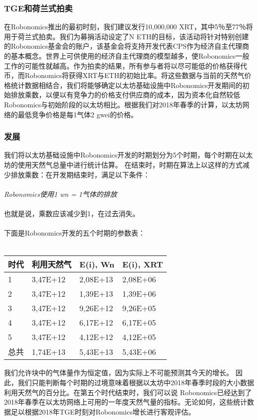 \documentclass[UTF8]{article}
\begin{document}
\subsubsection{TGE和荷兰式拍卖}

在Robonomics推出的最初时刻，我们建议发行10,000,000 XRT，其中5％至77％将用于荷兰式拍卖。我们为募捐活动设定了N ETH的目标，该活动将针对特别创建的Robonomics基金会的账户，该基金会将支持开发代表CPS作为经济自主代理商的基本概念。世界上可供使用的经济自主代理商的模型越多，使Robonomics一般工作的可能性就越高。作为拍卖的结果，所有参与者将以尽可能低的价格获得代币，而Robonomics将获得XRT与ETH的初始比率。将这些数据与当前的天然气价格统计数据相结合，我们将能够确定以太坊基础设施中Robonomics开发期间的初始排放乘数，以便以有竞争力的价格支付供应商的成本，因为资本化自然较低Robonomics与初始阶段的以太坊相比。根据我们对2018年春季的计算，以太坊网络的最低​​竞争价格是每1气体2 gwei的价格。

\subsubsection{发展}

我们将以太坊基础设施中Robonomics开发的时期划分为5个时期，每个时期在以太坊的使用天然气总量中进行统计估算。 在结束时，时期在算法上以这样的方式减少排放乘数：在开发期结束时，满足以下条件：
\\
\\
\textit{Robonomics使用1 wn = 1气体的排放}
\\
\\
也就是说，乘数应该减少到1，在过去消失。
\\
\\
下面是Robonomics开发的五个时期的参数表：
\\
\\
\begin{tabular}{ |l |l |l |l}
 \textbf{时代} & \textbf{利用天然气} & \textbf{E(i), Wn} & \textbf{E(i), XRT} \\ 
 \hline
 1 &  3,47E+12 & 2,08E+13 & 2,08E+06 \\ 
 2 &  3,47E+12 & 1,39E+13 & 1,39E+06 \\ 
 3 &  3,47E+12 & 9,26E+12 & 9,26E+05 \\ 
 4 &  3,47E+12 & 6,17E+12 & 6,17E+05 \\ 
 5 &  3,47E+12 & 4,12E+12 & 4,12E+05 \\ 
 总共 &  1,74E+13 & 5,43E+13 & 5,43E+06 \\ 
\end{tabular}

我们允许块中的气体量作为恒定值，因为实际上不可能预测其今天的增长。 因此，我们只能判断每个时期的过境意味着根据以太坊中2018年春季时段的大小数据利用天然气的百分比。在第五个时代结束时，我们可以说 Robonomics已经达到了2018年春季在以太坊网络上可用的一年度天然气量的指标。无论如何，这些统计数据足以根据2018年TGE时刻对Robonomics增长进行客观评估。
\end{document}
